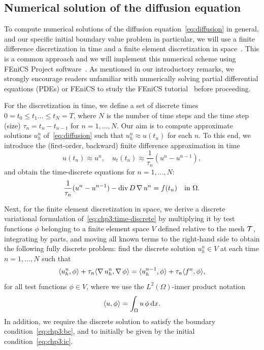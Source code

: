 \subsection{Numerical solution of the diffusion equation}
\label{sec:chp3:model-problem-numerical-formulation}

%
%
To compute numerical solutions of the diffusion
equation~\eqref{eq:diffusion} in general, and our specific initial
boundary value problem in particular, we will use a finite difference
discretization in time and a finite element discretization in
space~\cite{langtangen2019introduction,
  gockenbach2006understanding}. This is a common approach and we will
implement this numerical scheme using FEniCS Project
software~\cite{logg2012automated,alnaes2015fenics,langtangen2016solving}. As
mentioned in our introductory remarks, we strongly encourage readers
unfamiliar with numerically solving partial differential equations
(PDEs) or FEniCS to study the FEniCS
tutorial~\cite{langtangen2016solving} before proceeding.

For the discretization in time, we define a set of discrete times $0 =
t_0 \leq t_1 \dots \leq t_N = T$, where $N$ is the number of time
steps and the time step (size) $\tau_n = t_n - t_{n-1}$ for $n = 1,
\dots, N$. Our aim is to compute approximate solutions $u^n_h$
of~\eqref{eq:diffusion} such that $u^n_h \approx u(t_n)$ for each
$n$. To this end, we introduce the (first-order, backward) finite
difference approximation in time
\begin{equation}
  u(t_n) \approx u^n, \quad
  u_t(t_n) \approx \frac{1}{\tau_n} (u^n - u^{n-1}),
\end{equation}
and obtain the time-discrete equations for $n = 1, \dots, N$:
\begin{equation}
  \label{eq:chp3:time-discrete}
  \frac{1}{\tau_n} (u^n - u^{n-1}) - \operatorname{\mathrm{div}} D \operatorname{\nabla} u^n = f(t_n) \quad \text{in } \Omega. 
\end{equation}

Next, for the finite element discretization in space, we derive a
discrete variational formulation of~\eqref{eq:chp3:time-discrete} by
multiplying it by test functions $\phi$ belonging to a finite element space $V$
defined relative to the mesh $\mathcal{T}$, integrating by parts, and moving
all known terms to the right-hand side to obtain the following fully
discrete problem: find the discrete solution $u_h^n \in V$ at each
time $n = 1, \dots, N$ such that
\begin{equation}
  \label{eq:chp3:discrete}
  \langle u_h^n,\phi\rangle + \tau_n \langle \operatorname{\nabla} u_h^n,\operatorname{\nabla} \phi\rangle
  =  \langle u_h^{n-1},\phi\rangle + \tau_n \langle f^n,\phi\rangle,  
\end{equation}
for all test functions $\phi \in V$, where we use the
$L^2(\Omega)$-inner product notation
\begin{equation}
  \langle u,\phi\rangle = \int_{\Omega} u \, \phi \, \mathrm{d}x.
\end{equation}
In addition, we require the discrete solution to satisfy the
boundary condition~\eqref{eq:chp3:bc}, and to initially be given by the
initial condition~\eqref{eq:chp3:ic}.   

